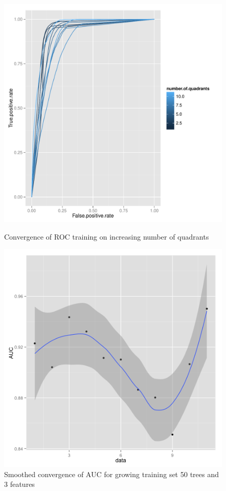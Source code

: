 \documentclass{article}\usepackage[]{graphicx}\usepackage[]{color}
\begin{document}
\begin{figure}[H]
  \includegraphics[width=\linewidth, height = 170pts]{ROC_converge1.pdf}
    \caption{Convergence of ROC training on increasing number of quadrants}\label{}
\endminipage
{}

\includegraphics[width=\linewidth, height = 170pts]{AUCconverge.png}
  \caption{Smoothed convergence of AUC for growing training set 50 trees and 3 features}\label{}
\endminipage

  \end{figure}
  
\end{document}
